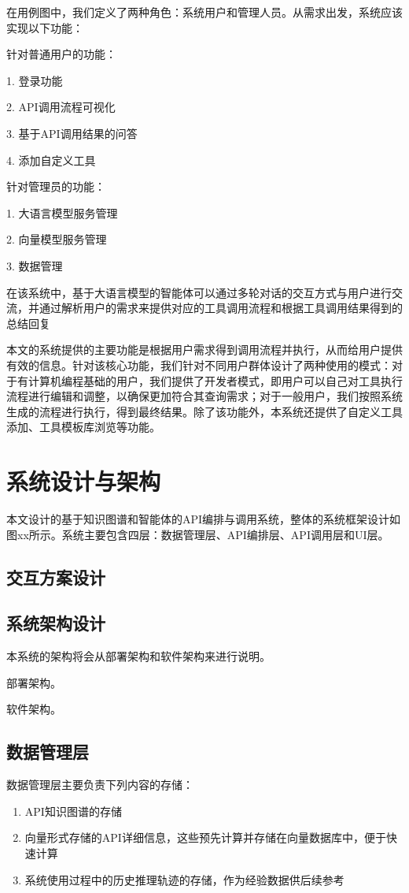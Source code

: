 在用例图中，我们定义了两种角色：系统用户和管理人员。从需求出发，系统应该实现以下功能：

针对普通用户的功能：

1. 登录功能

2. API调用流程可视化

3. 基于API调用结果的问答

4. 添加自定义工具

针对管理员的功能：

1. 大语言模型服务管理

2. 向量模型服务管理

3. 数据管理

在该系统中，基于大语言模型的智能体可以通过多轮对话的交互方式与用户进行交流，并通过解析用户的需求来提供对应的工具调用流程和根据工具调用结果得到的总结回复

本文的系统提供的主要功能是根据用户需求得到调用流程并执行，从而给用户提供有效的信息。针对该核心功能，我们针对不同用户群体设计了两种使用的模式：对于有计算机编程基础的用户，我们提供了开发者模式，即用户可以自己对工具执行流程进行编辑和调整，以确保更加符合其查询需求；对于一般用户，我们按照系统生成的流程进行执行，得到最终结果。除了该功能外，本系统还提供了自定义工具添加、工具模板库浏览等功能。

\section{系统设计与架构}
本文设计的基于知识图谱和智能体的API编排与调用系统，整体的系统框架设计如图xx所示。系统主要包含四层：数据管理层、API编排层、API调用层和UI层。

\subsection{交互方案设计}


\subsection{系统架构设计}

\indent 本系统的架构将会从部署架构和软件架构来进行说明。

部署架构。

软件架构。


\subsection{数据管理层}
数据管理层主要负责下列内容的存储：
\begin{enumerate}
    \item API知识图谱的存储
    \item 向量形式存储的API详细信息，这些预先计算并存储在向量数据库中，便于快速计算
    \item 系统使用过程中的历史推理轨迹的存储，作为经验数据供后续参考
\end{enumerate}

